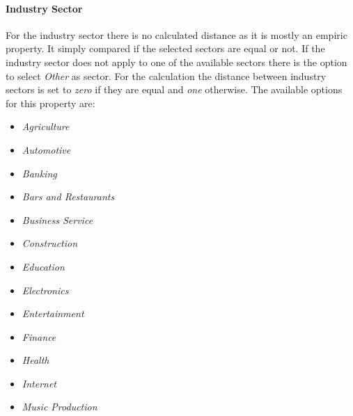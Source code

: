 \paragraph*{\textbf{Industry Sector}}
For the industry sector there is no calculated distance as it is mostly an empiric property. It simply compared if the selected sectors are equal or not. If the industry sector does not apply to one of the available sectors there is the option to select \textit{Other} as sector. For the calculation the distance between industry sectors is set to \textit{zero} if they are equal and  \textit{one} otherwise. The available options for this property are:
\begin{itemize}
	\item \textit{Agriculture}
	\item \textit{Automotive}
	\item \textit{Banking}
	\item \textit{Bars and Restaurants}
	\item \textit{Business Service}
	\item \textit{Construction}
	\item \textit{Education}
	\item \textit{Electronics}
	\item \textit{Entertainment}
	\item \textit{Finance}
	\item \textit{Health}
	\item \textit{Internet}
	\item \textit{Music Production}
\end{itemize}

